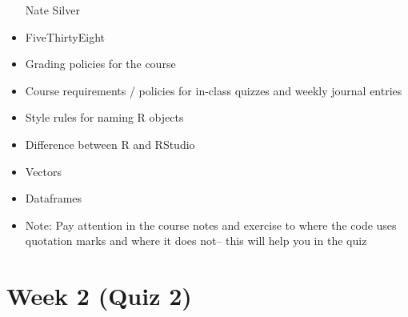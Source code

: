 \documentclass[]{book}
\theoremstyle{definition}
\theoremstyle{definition}
\theoremstyle{definition}
\theoremstyle{remark}
\begin{document}
\begin{itemize}
  Nate Silver
\item
  FiveThirtyEight
\item
  Grading policies for the course
\item
  Course requirements / policies for in-class quizzes and weekly journal
  entries
\item
  Style rules for naming R objects
\item
  Difference between R and RStudio
\item
  Vectors
\item
  Dataframes
\item
  Note: Pay attention in the course notes and exercise to where the code
  uses quotation marks and where it does not-- this will help you in the
  quiz
\end{itemize}

\section{Week 2 (Quiz 2)}\label{week-2-quiz-2}
\end{document}
